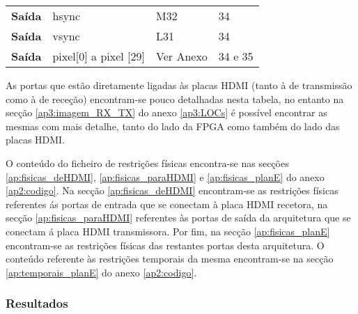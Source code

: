 \begin{table}[h!]
\begin{tabular}{rlll}
		\multicolumn{1}{r|}{\textbf{Saída}}   & hsync                                  & M32                                      & 34                                         \\
		\multicolumn{1}{r|}{\textbf{Saída}}   & vsync                                  & L31                                      & 34                                         \\
		\multicolumn{1}{r|}{\textbf{Saída}}   & pixel{[}0{]} a pixel {[}29{]}          & Ver Anexo                                & 34 e 35                                    \\ \hline
	\end{tabular}
\end{table}

As portas que estão diretamente ligadas às placas HDMI (tanto à de transmissão como à de receção) encontram-se pouco detalhadas nesta tabela, no entanto na secção \ref{ap3:imagem_RX_TX} do anexo \ref{ap3:LOCs} é possível encontrar as mesmas com mais detalhe, tanto do lado da FPGA como também do lado das placas HDMI.

O conteúdo do ficheiro de restrições físicas encontra-se nas secções \ref{ap:fisicas_deHDMI}, \ref{ap:fisicas_paraHDMI} e \ref{ap:fisicas_planE} do anexo \ref{ap2:codigo}. Na secção \ref{ap:fisicas_deHDMI} encontram-se as restrições físicas referentes ás portas de entrada que se conectam à placa HDMI recetora, na secção \ref{ap:fisicas_paraHDMI} referentes às portas de saída da arquitetura que se conectam á placa HDMI transmissora. Por fim, na secção \ref{ap:fisicas_planE} encontram-se as restrições físicas das restantes portas desta arquitetura. O conteúdo referente às restrições temporais da mesma encontram-se na secção \ref{ap:temporais_planE} do anexo \ref{ap2:codigo}.

\subsubsection{Resultados} \label{subsub:serial_planEresults}


